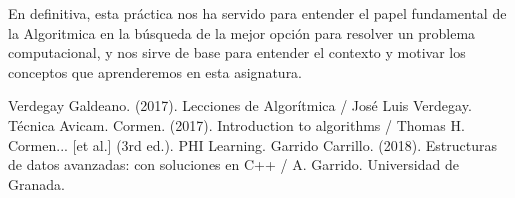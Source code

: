\documentclass{homework}
\begin{document}
    En definitiva, esta práctica nos ha servido para entender el papel fundamental de la Algoritmica en la búsqueda de la mejor opción para resolver un problema
    computacional, y nos sirve de base para entender el contexto y motivar los conceptos que aprenderemos en esta asignatura.

    \newpage
    \begin{thebibliography}{0}
         Verdegay Galdeano. (2017). Lecciones de Algorítmica / José Luis Verdegay. Técnica Avicam.
         Cormen. (2017). Introduction to algorithms / Thomas H. Cormen... [et al.] (3rd ed.). PHI Learning.
         Garrido Carrillo. (2018). Estructuras de datos avanzadas: con soluciones en C++ / A. Garrido. Universidad de Granada.        
    \end{thebibliography}
    
\end{document}
